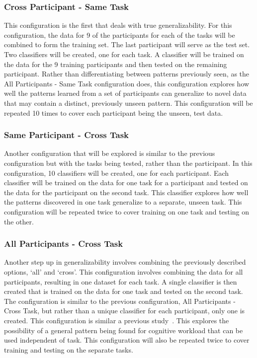 \documentclass[11pt]{article}
\begin{document}
\subsubsection{Cross Participant - Same Task}
This configuration is the first that deals with true generalizability. For this configuration, the data for 9 of the participants for each of the tasks will be combined to form the training set. The last participant will serve as the test set. Two classifiers will be created, one for each task. A classifier will be trained on the data for the 9 training participants and then tested on the remaining participant. Rather than differentiating between patterns previously seen, as the All Participants - Same Task configuration does, this configuration explores how well the patterns learned from a set of participants can generalize to novel data that may contain a distinct, previously unseen pattern. This configuration will be repeated 10 times to cover each participant being the unseen, test data.

\subsubsection{Same Participant - Cross Task}
Another configuration that will be explored is similar to the previous configuration but with the tasks being tested, rather than the participant. In this configuration, 10 classifiers will be created, one for each participant. Each classifier will be trained on the data for one task for a participant and tested on the data for the participant on the second task. This classifier explores how well the patterns discovered in one task generalize to a separate, unseen task. This configuration will be repeated twice to cover training on one task and testing on the other.

\subsubsection{All Participants - Cross Task}
Another step up in generalizability involves combining the previously described options, `all' and `cross'. This configuration involves combining the data for all participants, resulting in one dataset for each task. A single classifier is then created that is trained on the data for one task and tested on the second task. The configuration is similar to the previous configuration, All Participants - Cross Task, but rather than a unique classifier for each participant, only one is created. This configuration is similar a previous study~\cite{Ke}. This explores the possibility of a general pattern being found for cognitive workload that can be used independent of task. This configuration will also be repeated twice to cover training and testing on the separate tasks.
\end{document}
